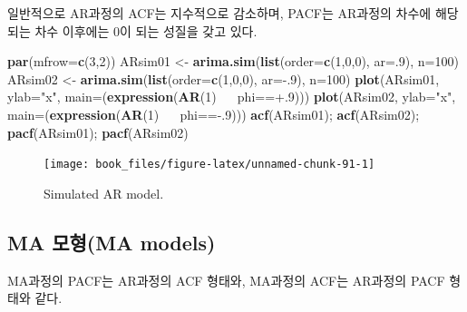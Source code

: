 \documentclass[b5paper,]{scrbook}
\makeatletter
\newenvironment{Shaded}{\begin{snugshade}}{\end{snugshade}}
\newcommand{\KeywordTok}[1]{\textcolor[rgb]{0.13,0.29,0.53}{\textbf{{#1}}}}
\newcommand{\DataTypeTok}[1]{\textcolor[rgb]{0.13,0.29,0.53}{{#1}}}
\newcommand{\DecValTok}[1]{\textcolor[rgb]{0.00,0.00,0.81}{{#1}}}
\newcommand{\StringTok}[1]{\textcolor[rgb]{0.31,0.60,0.02}{{#1}}}
\newcommand{\ErrorTok}[1]{\textcolor[rgb]{0.64,0.00,0.00}{\textbf{{#1}}}}
\newcommand{\NormalTok}[1]{{#1}}
\theoremstyle{plain}
\theoremstyle{definition}
\numberwithin{equation}{section}
\newenvironment{kframe}{%
\medskip{}
\setlength{\fboxsep}{.8em}
 \def\at@end@of@kframe{}%
 \ifinner\ifhmode%
  \def\at@end@of@kframe{\end{minipage}}%
  \begin{minipage}{\columnwidth}%
 \fi\fi%
 \def\FrameCommand##1{\hskip\@totalleftmargin \hskip-\fboxsep
 \colorbox{shadecolor}{##1}\hskip-\fboxsep
     \hskip-\linewidth \hskip-\@totalleftmargin \hskip\columnwidth}%
 \MakeFramed {\advance\hsize-\width
   \@totalleftmargin\z@ \linewidth\hsize
   \@setminipage}}%
 {\par\unskip\endMakeFramed%
 \at@end@of@kframe}
\renewenvironment{Shaded}{\begin{kframe}}{\end{kframe}}
\makeatother
\begin{document}
일반적으로 AR과정의 ACF는 지수적으로 감소하며, PACF는 AR과정의 차수에
해당되는 차수 이후에는 0이 되는 성질을 갖고 있다.

\begin{Shaded}
\begin{Highlighting}[]
\KeywordTok{par}\NormalTok{(}\DataTypeTok{mfrow=}\KeywordTok{c}\NormalTok{(}\DecValTok{3}\NormalTok{,}\DecValTok{2}\NormalTok{))}
\NormalTok{ARsim01 <-}\StringTok{ }\KeywordTok{arima.sim}\NormalTok{(}\KeywordTok{list}\NormalTok{(}\DataTypeTok{order=}\KeywordTok{c}\NormalTok{(}\DecValTok{1}\NormalTok{,}\DecValTok{0}\NormalTok{,}\DecValTok{0}\NormalTok{), }\DataTypeTok{ar=}\NormalTok{.}\DecValTok{9}\NormalTok{), }\DataTypeTok{n=}\DecValTok{100}\NormalTok{)}
\NormalTok{ARsim02 <-}\StringTok{ }\KeywordTok{arima.sim}\NormalTok{(}\KeywordTok{list}\NormalTok{(}\DataTypeTok{order=}\KeywordTok{c}\NormalTok{(}\DecValTok{1}\NormalTok{,}\DecValTok{0}\NormalTok{,}\DecValTok{0}\NormalTok{), }\DataTypeTok{ar=}\NormalTok{-.}\DecValTok{9}\NormalTok{), }\DataTypeTok{n=}\DecValTok{100}\NormalTok{)}
\KeywordTok{plot}\NormalTok{(ARsim01, }\DataTypeTok{ylab=}\StringTok{"x"}\NormalTok{, }\DataTypeTok{main=}\NormalTok{(}\KeywordTok{expression}\NormalTok{(}\KeywordTok{AR}\NormalTok{(}\DecValTok{1}\NormalTok{)~}\ErrorTok{~~}\NormalTok{phi==+.}\DecValTok{9}\NormalTok{)))}
\KeywordTok{plot}\NormalTok{(ARsim02, }\DataTypeTok{ylab=}\StringTok{"x"}\NormalTok{, }\DataTypeTok{main=}\NormalTok{(}\KeywordTok{expression}\NormalTok{(}\KeywordTok{AR}\NormalTok{(}\DecValTok{1}\NormalTok{)~}\ErrorTok{~~}\NormalTok{phi==-.}\DecValTok{9}\NormalTok{)))}
\KeywordTok{acf}\NormalTok{(ARsim01); }\KeywordTok{acf}\NormalTok{(ARsim02); }\KeywordTok{pacf}\NormalTok{(ARsim01); }\KeywordTok{pacf}\NormalTok{(ARsim02)}
\end{Highlighting}
\end{Shaded}

\begin{figure}

{\centering \texttt{[image: book\_files/figure-latex/unnamed-chunk-91-1]} 

}

\caption{Simulated AR model.}\label{fig:unnamed-chunk-91}
\end{figure}

\subsection{MA 모형(MA models)}\label{ma-ma-models}

MA과정의 PACF는 AR과정의 ACF 형태와, MA과정의 ACF는 AR과정의 PACF 형태와
같다.
\end{document}
